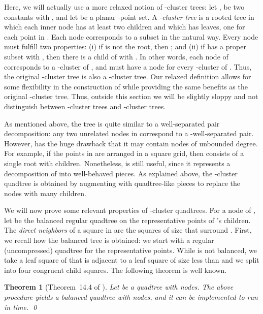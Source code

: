 \documentclass[11pt]{paper}
\newtheorem {theorem} {Theorem}[section]
\begin{document}
    Here, we will actually use a more relaxed notion of -cluster
    trees: let ,  be two constants with
    , and let  be a planar -point set.
    A \emph{-cluster tree}  is a rooted
    tree in which each inner node has at least two children and
    which has  leaves, one for each point in . 
    Each node  corresponds to a subset 
    in the natural way. Every node  must fulfill
    two properties:
    (i) if  is not the root, then
      ; and
    (ii) if  has a proper subset  with
       , then
       there is a child  of  with .
    In other words, each node of  corresponds to
    a -cluster of , and  must have a node for every
    -cluster of .  Thus, the original -cluster tree is also 
    a -cluster tree. Our relaxed definition allows for some flexibility
    in the construction of  while providing the same
    benefits as the original  -cluster tree. Thus, outside this section
    we will be slightly sloppy and not distinguish between -cluster trees
    and -cluster trees.

      As mentioned above, the tree  is quite similar 
      to a well-separated pair decomposition: any two unrelated nodes
      in  correspond to a -well-separated pair. 
      However,  has the huge drawback that it may contain
      nodes of unbounded degree.  For example, if
      the points in  are arranged in a square grid,
      then  consists of a single root with  children.
      Nonetheless,  is still useful, since it represents
      a decomposition of  into well-behaved pieces. 
      As explained above,  the -cluster quadtree
       is obtained by augmenting 
      with quadtree-like pieces to replace the nodes with many children.

      
      We will now prove some relevant properties of -cluster
      quadtrees. 
      For a node  of , let  be the balanced regular 
      quadtree on the representative points of 's children.
      The \emph{direct neighbors} of a square  in  
      are the  squares of size  that surround .
      First, we recall how the balanced tree  is obtained: we start with
      a regular (uncompressed) quadtree  for the representative points.
      While  is not balanced, we take a leaf square  of  that
      is adjacent to a leaf square of size less than  and
      we split  into four congruent child squares. The following
      theorem is well known.
     \begin {theorem} [Theorem~14.4 of \cite{deBergChvKrOv08}]
    \label {thm:balance}
      Let  be a quadtree with  nodes. 
      The above procedure yields a balanced
      quadtree with  nodes, and it can be implemented
      to run in  time.
      \qed
    \end {theorem}
\end{document}
